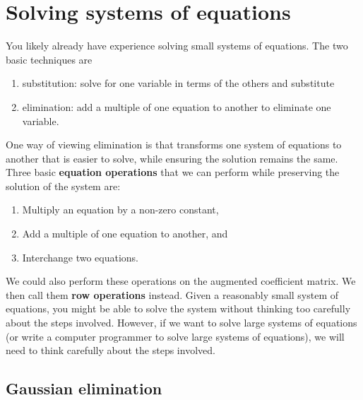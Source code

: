 \documentclass[12pt,reqno]{amsart}
\theoremstyle{definition}
\begin{document}
\section{Solving systems of equations}
You likely already have experience solving small systems of
equations. The two basic techniques are
\begin{enumerate}
\item substitution: solve for one variable in terms of the others and
  substitute 
\item elimination: add a multiple of one equation to another to
  eliminate one variable.
\end{enumerate}
One way of viewing elimination is that transforms one system of
equations to another that is easier to solve, while ensuring the
solution remains the same. Three basic \textbf{equation operations}
that we can perform while preserving the solution of the system are:
\begin{enumerate}
\item Multiply an equation by a non-zero constant,
\item Add a multiple of one equation to another, and
\item Interchange two equations.
\end{enumerate}
We could also perform these operations on the augmented coefficient
matrix. We then call them \textbf{row operations} instead.  Given a
reasonably small system of equations, you might be able to solve
the system without thinking too carefully about the steps
involved. However, if we want to solve large systems of equations (or
write a computer programmer to solve large systems of equations), we
will need to think carefully about the steps involved. 

\subsection{Gaussian elimination}
\end{document}
